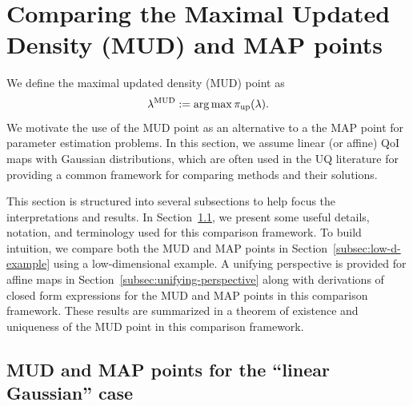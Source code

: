 \section{Comparing the Maximal Updated Density (MUD) and MAP points}\label{sec:estimation}

We define the maximal updated density (MUD) point as
\begin{equation}\label{eq:mudpt_inital_defn}
	\lambda^{\text{MUD}} := \operatorname*{arg\,max} {\operatorname*{\pi_{up}}}(\lambda).
\end{equation}
We motivate the use of the MUD point as an alternative to a the MAP point for parameter estimation problems.
In this section, we assume linear (or affine) QoI maps with Gaussian distributions, which are often used in the UQ literature for providing a common framework for comparing methods and their solutions.

This section is structured into several subsections to help focus the interpretations and results.
In Section~\ref{subsec:Motivation}, we present some useful details, notation, and terminology used for this comparison framework.
To build intuition, we compare both the MUD and MAP points in Section~\ref{subsec:low-d-example} using a low-dimensional example.
A unifying perspective is provided for affine maps in Section~\ref{subsec:unifying-perspective} along with derivations of closed form expressions for the MUD and MAP points in this comparison framework.
These results are summarized in a theorem of existence and uniqueness of the MUD point in this comparison framework.


\subsection{MUD and MAP points for the ``linear Gaussian'' case}\label{subsec:Motivation}

